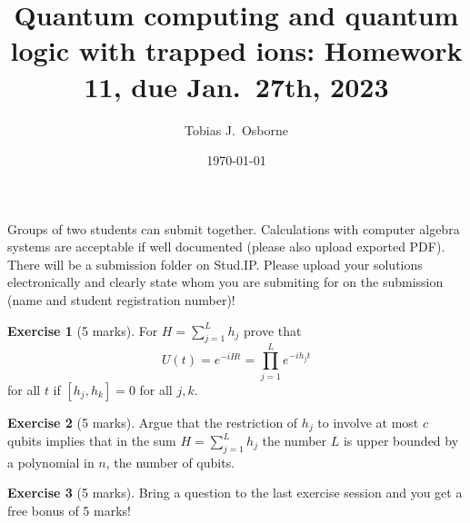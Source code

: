 \documentclass[12pt,oneside]{amsart}
\title[Quantum computing and quantum logic with trapped ions]{Quantum computing and quantum logic with trapped ions: Homework 11, due Jan.\ 27th, 2023}
\author{Tobias J.\ Osborne}
\date{\today}                                                %
\theoremstyle{plain}%
\theoremstyle{definition}
\newtheorem{exercise}{\color{cgblue}Exercise}[section]
\theoremstyle{remark}
\begin{document}
\maketitle


\maketitle
Groups of two students can submit together. Calculations with computer algebra systems are acceptable if well documented (please also upload exported PDF). There will be a submission folder on Stud.IP. Please upload your solutions electronically and clearly state whom you are submiting for on the submission (name and student registration number)!

\setcounter{section}{1}

\begin{exercise}[5 marks]
  For $H = \sum_{j=1}^L h_j$ prove that 
  \begin{equation}
    U(t) = e^{-iHt} = \prod_{j=1}^L e^{-ih_jt}
  \end{equation}
  for all $t$ if $[h_j,h_k]= 0$ for all $j,k$.
\end{exercise}

\begin{exercise}[5 marks]
  Argue that the restriction of $h_j$ to involve at most $c$ qubits implies that in the sum $H = \sum_{j=1}^L h_j$ the number $L$ is upper bounded by a polynomial in $n$, the number of qubits.
\end{exercise}

\begin{exercise}[5 marks]
  Bring a question to the last exercise session and you get a free bonus of 5 marks!
\end{exercise}
\end{document}
